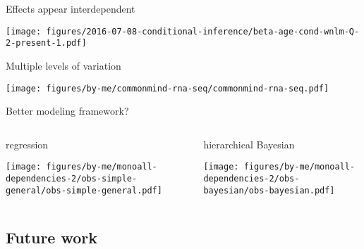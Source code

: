 \documentclass{beamer} %
\newcommand{\platefigscale}[0]{0.7}
\begin{document}
\begin{frame}[label=interaction]{Effects appear interdependent}

\texttt{[image: figures/2016-07-08-conditional-inference/beta-age-cond-wnlm-Q-2-present-1.pdf]}
\end{frame}

\begin{frame}{Multiple levels of variation}
\begin{center}
\texttt{[image: figures/by-me/commonmind-rna-seq/commonmind-rna-seq.pdf]}
\end{center}
\end{frame}

\begin{frame}{Better modeling framework?}
\begin{columns}[t]
\begin{column}{0.5\textwidth}
\begin{center}
regression

\texttt{[image: figures/by-me/monoall-dependencies-2/obs-simple-general/obs-simple-general.pdf]}
\end{center}
\end{column}

\begin{column}{0.5\textwidth}
\begin{center}
hierarchical Bayesian

\texttt{[image: figures/by-me/monoall-dependencies-2/obs-bayesian/obs-bayesian.pdf]}
\end{center}
\end{column}
\end{columns}
\end{frame}


\subsection{Future work}
\end{document}
